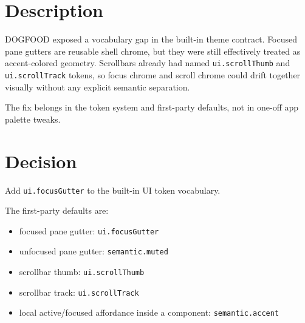 \section{Description}\label{record-177-description}

DOGFOOD exposed a vocabulary gap in the built-in theme contract. Focused pane gutters are reusable shell chrome, but they were still effectively treated as accent-colored geometry. Scrollbars already had named \texttt{u\allowbreak{}i\allowbreak{}.\allowbreak{}s\allowbreak{}c\allowbreak{}r\allowbreak{}o\allowbreak{}l\allowbreak{}l\allowbreak{}T\allowbreak{}h\allowbreak{}u\allowbreak{}m\allowbreak{}b} and \texttt{u\allowbreak{}i\allowbreak{}.\allowbreak{}s\allowbreak{}c\allowbreak{}r\allowbreak{}o\allowbreak{}l\allowbreak{}l\allowbreak{}T\allowbreak{}r\allowbreak{}a\allowbreak{}c\allowbreak{}k} tokens, so focus chrome and scroll chrome could drift together visually without any explicit semantic separation.

The fix belongs in the token system and first-party defaults, not in one-off app palette tweaks.

\section{Decision}\label{record-177-decision}

Add \texttt{u\allowbreak{}i\allowbreak{}.\allowbreak{}f\allowbreak{}o\allowbreak{}c\allowbreak{}u\allowbreak{}s\allowbreak{}G\allowbreak{}u\allowbreak{}t\allowbreak{}t\allowbreak{}e\allowbreak{}r} to the built-in UI token vocabulary.

The first-party defaults are:

\begin{itemize}
\tightlist
\item
  focused pane gutter: \texttt{u\allowbreak{}i\allowbreak{}.\allowbreak{}f\allowbreak{}o\allowbreak{}c\allowbreak{}u\allowbreak{}s\allowbreak{}G\allowbreak{}u\allowbreak{}t\allowbreak{}t\allowbreak{}e\allowbreak{}r}
\item
  unfocused pane gutter: \texttt{s\allowbreak{}e\allowbreak{}m\allowbreak{}a\allowbreak{}n\allowbreak{}t\allowbreak{}i\allowbreak{}c\allowbreak{}.\allowbreak{}m\allowbreak{}u\allowbreak{}t\allowbreak{}e\allowbreak{}d}
\item
  scrollbar thumb: \texttt{u\allowbreak{}i\allowbreak{}.\allowbreak{}s\allowbreak{}c\allowbreak{}r\allowbreak{}o\allowbreak{}l\allowbreak{}l\allowbreak{}T\allowbreak{}h\allowbreak{}u\allowbreak{}m\allowbreak{}b}
\item
  scrollbar track: \texttt{u\allowbreak{}i\allowbreak{}.\allowbreak{}s\allowbreak{}c\allowbreak{}r\allowbreak{}o\allowbreak{}l\allowbreak{}l\allowbreak{}T\allowbreak{}r\allowbreak{}a\allowbreak{}c\allowbreak{}k}
\item
  local active/focused affordance inside a component: \texttt{s\allowbreak{}e\allowbreak{}m\allowbreak{}a\allowbreak{}n\allowbreak{}t\allowbreak{}i\allowbreak{}c\allowbreak{}.\allowbreak{}a\allowbreak{}c\allowbreak{}c\allowbreak{}e\allowbreak{}n\allowbreak{}t}
\end{itemize}

